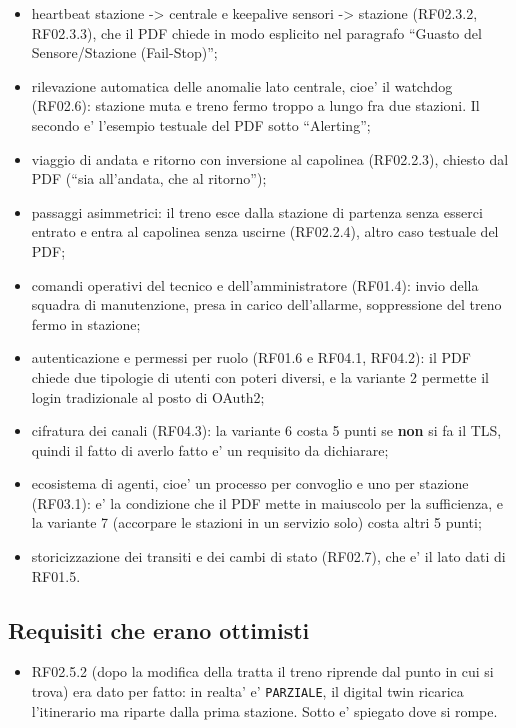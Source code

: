 \documentclass[11pt]{article}
\begin{document}
\begin{itemize}
\item heartbeat stazione -> centrale e keepalive sensori -> stazione (RF02.3.2, RF02.3.3), che il PDF
chiede in modo esplicito nel paragrafo ``Guasto del Sensore/Stazione (Fail-Stop)'';
\item rilevazione automatica delle anomalie lato centrale, cioe' il watchdog (RF02.6): stazione muta e
treno fermo troppo a lungo fra due stazioni. Il secondo e' l'esempio testuale del PDF sotto
``Alerting'';
\item viaggio di andata e ritorno con inversione al capolinea (RF02.2.3), chiesto dal PDF (``sia
all'andata, che al ritorno'');
\item passaggi asimmetrici: il treno esce dalla stazione di partenza senza esserci entrato e entra al
capolinea senza uscirne (RF02.2.4), altro caso testuale del PDF;
\item comandi operativi del tecnico e dell'amministratore (RF01.4): invio della squadra di manutenzione,
presa in carico dell'allarme, soppressione del treno fermo in stazione;
\item autenticazione e permessi per ruolo (RF01.6 e RF04.1, RF04.2): il PDF chiede due tipologie di
utenti con poteri diversi, e la variante 2 permette il login tradizionale al posto di OAuth2;
\item cifratura dei canali (RF04.3): la variante 6 costa 5 punti se \textbf{non} si fa il TLS, quindi il fatto
di averlo fatto e' un requisito da dichiarare;
\item ecosistema di agenti, cioe' un processo per convoglio e uno per stazione (RF03.1): e' la
condizione che il PDF mette in maiuscolo per la sufficienza, e la variante 7 (accorpare le
stazioni in un servizio solo) costa altri 5 punti;
\item storicizzazione dei transiti e dei cambi di stato (RF02.7), che e' il lato dati di RF01.5.
\end{itemize}
\subsection{Requisiti che erano ottimisti}
\label{sec:org1b30ecb}

\begin{itemize}
\item RF02.5.2 (dopo la modifica della tratta il treno riprende dal punto in cui si trova) era dato per
fatto: in realta' e' \texttt{PARZIALE}, il digital twin ricarica l'itinerario ma riparte dalla prima
stazione. Sotto e' spiegato dove si rompe.
\end{itemize}
\end{document}
